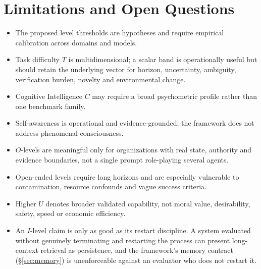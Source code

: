 \documentclass[11pt]{article}
\theoremstyle{definition}
\begin{document}
\section{Limitations and Open Questions}\label{sec:limitations}

\begin{itemize}
\item The proposed level thresholds are hypotheses and require empirical calibration across domains and models.
\item Task difficulty $T$ is multidimensional; a scalar band is operationally useful but should retain the underlying vector for horizon, uncertainty, ambiguity, verification burden, novelty and environmental change.
\item Cognitive Intelligence $C$ may require a broad psychometric profile rather than one benchmark family.
\item Self-awareness is operational and evidence-grounded; the framework does not address phenomenal consciousness.
\item $O$-levels are meaningful only for organizations with real state, authority and evidence boundaries, not a single prompt role-playing several agents.
\item Open-ended levels require long horizons and are especially vulnerable to contamination, resource confounds and vague success criteria.
\item Higher $U$ denotes broader validated capability, not moral value, desirability, safety, speed or economic efficiency.
\item An $I$-level claim is only as good as its restart discipline. A system evaluated without genuinely terminating and restarting the process can present long-context retrieval as persistence, and the framework's memory contract (\S\ref{sec:memory}) is unenforceable against an evaluator who does not restart it.
\end{itemize}
\end{document}
